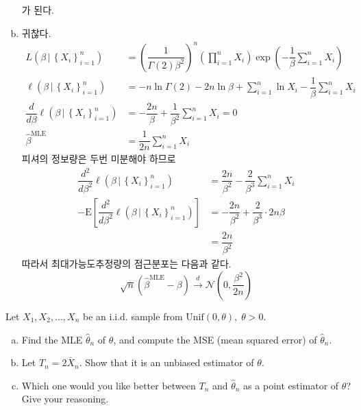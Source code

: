\documentclass[answers]{exam}
\begin{document}
\begin{questions}
\begin{solution}
\begin{enumerate}[(a)]
      가 된다.
      \item 귀찮다.
      \begin{align}
        L\left(\beta\,|\,\left\{X_{i}\right\}_{i=1}^{n}\right) &= \left(\dfrac{1}{\Gamma\left(2\right)\beta^{2}}\right)^{n}\left(\prod_{i=1}^{n}X_{i}\right)\exp\left(-\dfrac{1}{\beta}\sum_{i=1}^{n}X_{i}\right)\\
        \ell\left(\beta\,|\,\left\{X_{i}\right\}_{i=1}^{n}\right) &= -n\ln\Gamma\left(2\right)-2n\ln \beta +\sum_{i=1}^{n}\ln X_{i} -\dfrac{1}{\beta}\sum_{i=1}^{n}X_{i}\\
        \dfrac{d}{d\beta}\ell\left(\beta\,|\,\left\{X_{i}\right\}_{i=1}^{n}\right) &= -\dfrac{2n}{\beta}+\dfrac{1}{\beta^{2}}\sum_{i=1}^{n}X_{i}=0\\
        \widehat{\beta}^{\text{MLE}} &= \dfrac{1}{2n}\sum_{i=1}^{n}X_{i}
      \end{align}
      피셔의 정보량은 두번 미분해야 하므로
      \begin{align}
        \dfrac{d^{2}}{d\beta^{2}}\ell\left(\beta\,|\,\left\{X_{i}\right\}_{i=1}^{n}\right) &= \dfrac{2n}{\beta^{2}}-\dfrac{2}{\beta^{3}}\sum_{i=1}^{n}X_{i}\\
        -\mathrm{E}\left[\dfrac{d^{2}}{d\beta^{2}}\ell\left(\beta\,|\,\left\{X_{i}\right\}_{i=1}^{n}\right) \right] &= -\dfrac{2n}{\beta^{2}}+\dfrac{2}{\beta^{3}}\cdot 2n\beta\\
        &= \dfrac{2n}{\beta^{2}}
      \end{align}
      따라서 최대가능도추정량의 점근분포는 다음과 같다.
      \begin{equation}
        \sqrt{n}\left(\widehat{\beta}^{\text{MLE}}-\beta\right) \xrightarrow{d}\mathcal{N}\left(0,\dfrac{\beta^{2}}{2n}\right)
      \end{equation}
    \end{enumerate}
   \end{solution}
   \question
   Let $X_{1},X_{2},\ldots,X_{n}$ be an i.i.d. sample from $\mathrm{Unif}\left(0,\theta\right), \; \theta>0$.
   \begin{enumerate}[(a)]
    \item Find the MLE $\widehat{\theta}_{n}$ of $\theta$, and compute the MSE (mean squared error) of $\widehat{\theta}_{n}$.
    \item Let $T_{n}=2\overline{X}_{n}$. Show that it is an unbiased estimator of $\theta$.
    \item Which one would you like better between $T_{n}$ and $\widehat{\theta}_{n}$ as a point estimator of $\theta$? Give your reasoning.

\end{enumerate}
\end{questions}
\end{document}
